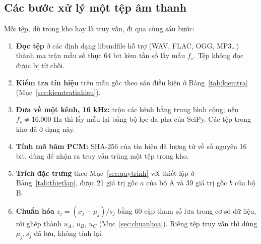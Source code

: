 \documentclass[11pt,a4paper]{article}
\begin{document}
\subsection{Các bước xử lý một tệp âm thanh}\label{sec:buocxuly}
Mỗi tệp, dù trong kho hay là truy vấn, đi qua cùng sáu bước:
\begin{enumerate}
\item \textbf{Đọc tệp} ở các định dạng libsndfile hỗ trợ (WAV, FLAC, OGG, MP3\ldots) thành ma trận mẫu số thực 64 bit kèm tần số lấy mẫu $f_s$. Tệp không đọc được bị từ chối.
\item \textbf{Kiểm tra tín hiệu} trên mẫu gốc theo sáu điều kiện ở Bảng~\ref{tab:kiemtra} (Mục~\ref{sec:kiemtratinhieu}).
\item \textbf{Đưa về một kênh, 16 kHz:} trộn các kênh bằng trung bình cộng; nếu $f_s\ne16.000$ Hz thì lấy mẫu lại bằng bộ lọc đa pha của SciPy. Các tệp trong kho đã ở dạng này.
\item \textbf{Tính mã băm PCM:} SHA-256 của tín hiệu đã lượng tử về số nguyên 16 bit, dùng để nhận ra truy vấn trùng một tệp trong kho.
\item \textbf{Trích đặc trưng} theo Mục~\ref{sec:quytrinh} với thiết lập ở Bảng~\ref{tab:thietlap}, được 21 giá trị gốc $a$ của bộ A và 39 giá trị gốc $b$ của bộ B.
\item \textbf{Chuẩn hóa} $z_j=(x_j-\mu_j)/s_j$ bằng 60 cặp tham số lưu trong cơ sở dữ liệu, rồi ghép thành $u_A$, $u_B$, $u_C$ (Mục~\ref{sec:chuanhoa}). Riêng tệp truy vấn thì dùng $\mu_j, s_j$ đã lưu, không tính lại.
\end{enumerate}
\end{document}
